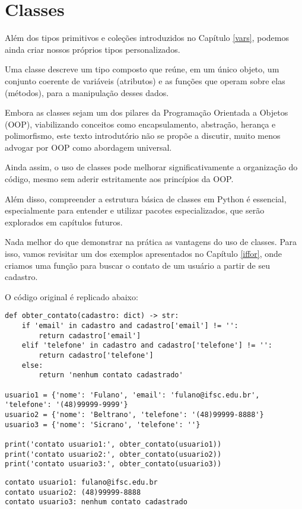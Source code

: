 \chapter{Classes}\label{class}

Além dos tipos primitivos e coleções introduzidos no Capítulo \ref{vars}, podemos ainda criar nossos próprios tipos personalizados.

Uma classe descreve um tipo composto que reúne, em um único objeto, um conjunto coerente de variáveis (atributos) e as
funções que operam sobre elas (métodos), para a manipulação desses dados.


Embora as classes sejam um dos pilares da Programação Orientada a Objetos (OOP), viabilizando conceitos como encapsulamento,
abstração, herança e polimorfismo, este texto introdutório não se propõe a discutir, muito menos advogar por OOP como
abordagem universal.

Ainda assim, o uso de classes pode melhorar significativamente a organização do código, mesmo sem aderir estritamente
aos princípios da OOP.

Além disso, compreender a estrutura básica de classes em Python é essencial, especialmente para entender e utilizar
pacotes especializados, que serão explorados em capítulos futuros.

Nada melhor do que demonstrar na prática as vantagens do uso de classes.
Para isso, vamos revisitar um dos exemplos apresentados no Capítulo \ref{iffor}, onde criamos uma função para buscar
o contato de um usuário a partir de seu cadastro.

O código original é replicado abaixo:

\begin{verbatim}
def obter_contato(cadastro: dict) -> str:
    if 'email' in cadastro and cadastro['email'] != '':
        return cadastro['email']
    elif 'telefone' in cadastro and cadastro['telefone'] != '':
        return cadastro['telefone']
    else:
        return 'nenhum contato cadastrado'

usuario1 = {'nome': 'Fulano', 'email': 'fulano@ifsc.edu.br', 'telefone': '(48)99999-9999'}
usuario2 = {'nome': 'Beltrano', 'telefone': '(48)99999-8888'}
usuario3 = {'nome': 'Sicrano', 'telefone': ''}

print('contato usuario1:', obter_contato(usuario1))
print('contato usuario2:', obter_contato(usuario2))
print('contato usuario3:', obter_contato(usuario3))
\end{verbatim}
\begin{verbatim}
contato usuario1: fulano@ifsc.edu.br
contato usuario2: (48)99999-8888
contato usuario3: nenhum contato cadastrado
\end{verbatim}

